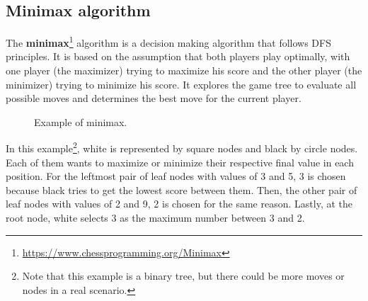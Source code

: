 \subsection{Minimax algorithm}

The \textbf{minimax}\footnote{\url{https://www.chessprogramming.org/Minimax}} algorithm is a decision making algorithm that follows DFS principles. It is based on the assumption that both players play optimally, with one player (the maximizer) trying to maximize his score and the other player (the minimizer) trying to minimize his score. It explores the game tree to evaluate all possible moves and determines the best move for the current player.

\begin{figure}[H]
    \centering
    \caption{Example of minimax.}
    \label{fig:minimax}
\end{figure}

In this example\footnote{Note that this example is a binary tree, but there could be more moves or nodes in a real scenario.}, white is represented by square nodes and black by circle nodes. Each of them wants to maximize or minimize their respective final value in each position. For the leftmost pair of leaf nodes with values of 3 and 5, 3 is chosen because black tries to get the lowest score between them. Then, the other pair of leaf nodes with values of 2 and 9, 2 is chosen for the same reason. Lastly, at the root node, white selects 3 as the maximum number between 3 and 2.


